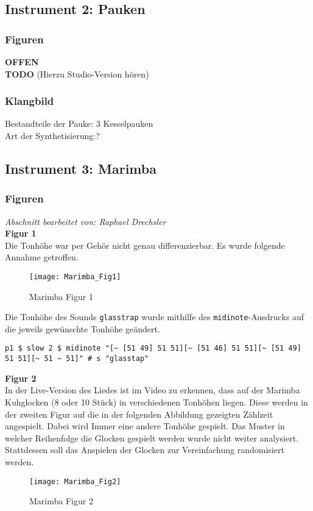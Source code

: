 \documentclass[
10pt, %
a4paper, %
oneside, %
headinclude,footinclude, %
BCOR5mm, %
]{scrartcl}
\begin{document}
\subsection{Instrument 2: Pauken}
\subsubsection{Figuren}
{\color{red}\textbf{OFFEN}} \\
{\color{red}\textbf{TODO}}
(Hierzu Studio-Version hören)\\

\subsubsection{Klangbild}
Bestandteile der Pauke: 3 Kesselpauken\\
Art der Synthetisierung:?\\


\subsection{Instrument 3: Marimba}
\subsubsection{Figuren}
\textit{Abschnitt bearbeitet von: Raphael Drechsler}\\

\noindent \textbf{Figur 1}\\
Die Tonhöhe war per Gehör nicht genau differenzierbar. Es wurde folgende Annahme getroffen.
\begin{figure}[h]
	\centering 
	\texttt{[image: Marimba\_Fig1]} 
	\caption{Marimba Figur 1}
\end{figure}

\noindent Die Tonhöhe des Sounds \verb|glasstrap| wurde mithilfe des \verb|midinote|-Ausdrucks \cite{tid6} auf die jeweils gewünschte Tonhöhe geändert.
\begin{lstlisting}
p1 $ slow 2 $ midinote "[~ [51 49] 51 51][~ [51 46] 51 51][~ [51 49] 51 51][~ 51 ~ 51]" # s "glasstap"
\end{lstlisting}


\noindent \textbf{Figur 2}\\
In der Live-Version des Liedes ist im Video zu erkennen, dass auf der Marimba Kuhglocken (8 oder 10 Stück) in verschiedenen Tonhöhen liegen. Diese werden in der zweiten Figur auf die in der folgenden Abbildung gezeigten Zählzeit angespielt. Dabei wird Immer eine andere Tonhöhe gespielt. Das Muster in welcher Reihenfolge die Glocken gespielt werden wurde nicht weiter analysiert. Stattdessen soll das Anspielen der Glocken zur Vereinfachung randomisiert werden.
\begin{figure}[h]
	\centering 
	\texttt{[image: Marimba\_Fig2]} 
	\caption{Marimba Figur 2}
\end{figure}
\end{document}

